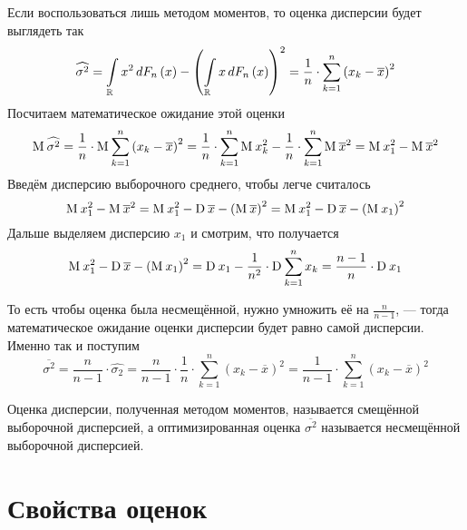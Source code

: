 Если воспользоваться лишь методом моментов, то оценка дисперсии будет выглядеть
так
\begin{equation*}
  \widehat{\sigma^2}
  = \integrall{\mathbb{R}}{dF_n\left( x \right)}{x^2}
    - \left( \integrall{\mathbb{R}}{dF_n\left( x \right)}{x} \right)^2
  = \frac{1}{n} \cdot \sum_{k=1}^n \left( x_k-\overline{x} \right)^2
\end{equation*}
Посчитаем математическое ожидание этой оценки
\begin{equation*}
  \mean{\widehat{\sigma^2}}
  = \frac{1}{n} \cdot \mean{\sum_{k=1}^n \left( x_k-\overline{x} \right)^2}
  = \frac{1}{n} \cdot \sum_{k=1}^{n} \mean{x_k^2}
    - \frac{1}{n} \cdot \sum_{k=1}^{n} \mean{\overline{x}^2}
  = \mean{x_1^2} - \mean{\overline{x}^2}
\end{equation*}
Введём дисперсию выборочного среднего, чтобы легче считалось
\begin{equation*}
  \mean{x_1^2} - \mean{\overline{x}^2}
  = \mean{x_1^2} - \dispersion{\overline{x}}
    - \left( \mean{\overline{x}} \right)^2
  = \mean{x_1^2} - \dispersion{\overline{x}} - \left( \mean{x_1} \right)^2
\end{equation*}
Дальше выделяем дисперсию $x_1$ и смотрим, что получается
\begin{equation*}
  \mean{x_1^2} - \dispersion{\overline{x}} - \left( \mean{x_1} \right)^2
  = \dispersion{x_1} - \frac{1}{n^2} \cdot \dispersion{\sum_{k=1}^{n} x_k}
  = \frac{n-1}{n} \cdot \dispersion{x_1}
\end{equation*}

То есть чтобы оценка была несмещённой, нужно умножить её на $\frac{n}{n-1}$,
--- тогда математическое ожидание оценки дисперсии будет равно самой дисперсии.
Именно так и поступим
\begin{equation*}
  \overline{\sigma^2}
  = \frac{n}{n-1} \cdot \widehat{\sigma_2}
  = \frac{n}{n-1} \cdot \frac{1}{n}
    \cdot \sum_{k=1}^n \left( x_k-\overline{x} \right)^2
  = \frac{1}{n-1} \cdot \sum_{k=1}^n \left( x_k-\overline{x} \right)^2
\end{equation*}

Оценка дисперсии, полученная методом моментов, называется смещённой выборочной
дисперсией, а оптимизированная оценка $\overline{\sigma^2}$ называется
несмещённой выборочной дисперсией.

\section{Свойства оценок}
